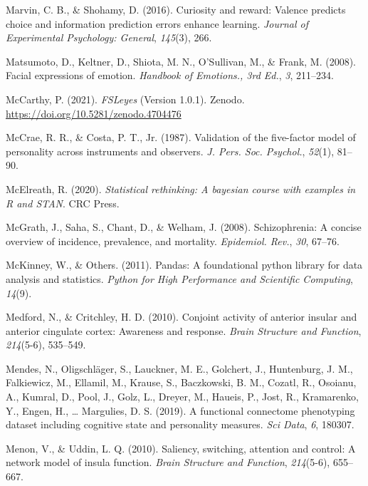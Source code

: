 \documentclass[11pt,american,a4paper,oneside,]{memoir} %
\begin{document}
\leavevmode\hypertarget{ref-marvin2016curiosity}{}%
Marvin, C. B., \& Shohamy, D. (2016). Curiosity and reward: Valence predicts choice and information prediction errors enhance learning. \emph{Journal of Experimental Psychology: General}, \emph{145}(3), 266.

\leavevmode\hypertarget{ref-Matsumoto2008-qk}{}%
Matsumoto, D., Keltner, D., Shiota, M. N., O'Sullivan, M., \& Frank, M. (2008). Facial expressions of emotion. \emph{Handbook of Emotions., 3rd Ed.}, \emph{3}, 211--234.

\leavevmode\hypertarget{ref-McCarthy2019-yt}{}%
McCarthy, P. (2021). \emph{FSLeyes} (Version 1.0.1). Zenodo. \url{https://doi.org/10.5281/zenodo.4704476}

\leavevmode\hypertarget{ref-McCrae1987-ww}{}%
McCrae, R. R., \& Costa, P. T., Jr. (1987). Validation of the five-factor model of personality across instruments and observers. \emph{J. Pers. Soc. Psychol.}, \emph{52}(1), 81--90.

\leavevmode\hypertarget{ref-McElreath2020-pz}{}%
McElreath, R. (2020). \emph{Statistical rethinking: A bayesian course with examples in R and STAN}. CRC Press.

\leavevmode\hypertarget{ref-McGrath2008-oj}{}%
McGrath, J., Saha, S., Chant, D., \& Welham, J. (2008). Schizophrenia: A concise overview of incidence, prevalence, and mortality. \emph{Epidemiol. Rev.}, \emph{30}, 67--76.

\leavevmode\hypertarget{ref-McKinney2011-kl}{}%
McKinney, W., \& Others. (2011). Pandas: A foundational python library for data analysis and statistics. \emph{Python for High Performance and Scientific Computing}, \emph{14}(9).

\leavevmode\hypertarget{ref-medford2010conjoint}{}%
Medford, N., \& Critchley, H. D. (2010). Conjoint activity of anterior insular and anterior cingulate cortex: Awareness and response. \emph{Brain Structure and Function}, \emph{214}(5-6), 535--549.

\leavevmode\hypertarget{ref-Mendes2019-yh}{}%
Mendes, N., Oligschläger, S., Lauckner, M. E., Golchert, J., Huntenburg, J. M., Falkiewicz, M., Ellamil, M., Krause, S., Baczkowski, B. M., Cozatl, R., Osoianu, A., Kumral, D., Pool, J., Golz, L., Dreyer, M., Haueis, P., Jost, R., Kramarenko, Y., Engen, H., \ldots{} Margulies, D. S. (2019). A functional connectome phenotyping dataset including cognitive state and personality measures. \emph{Sci Data}, \emph{6}, 180307.

\leavevmode\hypertarget{ref-menon2010saliency}{}%
Menon, V., \& Uddin, L. Q. (2010). Saliency, switching, attention and control: A network model of insula function. \emph{Brain Structure and Function}, \emph{214}(5-6), 655--667.
\end{document}
